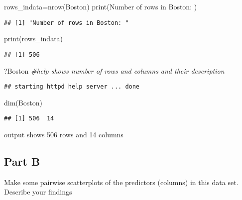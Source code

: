 \documentclass[
]{article}
\newenvironment{Shaded}{\begin{snugshade}}{\end{snugshade}}
\newcommand{\CommentTok}[1]{\textcolor[rgb]{0.56,0.35,0.01}{\textit{#1}}}
\newcommand{\FunctionTok}[1]{\textcolor[rgb]{0.00,0.00,0.00}{#1}}
\newcommand{\NormalTok}[1]{#1}
\newcommand{\OtherTok}[1]{\textcolor[rgb]{0.56,0.35,0.01}{#1}}
\newcommand{\StringTok}[1]{\textcolor[rgb]{0.31,0.60,0.02}{#1}}
\begin{document}
\begin{Shaded}
\begin{Highlighting}[]
\NormalTok{rows\_indata}\OtherTok{=}\FunctionTok{nrow}\NormalTok{(Boston)}
\FunctionTok{print}\NormalTok{(}\StringTok{\textquotesingle{}Number of rows in Boston: \textquotesingle{}}\NormalTok{)}
\end{Highlighting}
\end{Shaded}

\begin{verbatim}
## [1] "Number of rows in Boston: "
\end{verbatim}

\begin{Shaded}
\begin{Highlighting}[]
\FunctionTok{print}\NormalTok{(rows\_indata)}
\end{Highlighting}
\end{Shaded}

\begin{verbatim}
## [1] 506
\end{verbatim}

\begin{Shaded}
\begin{Highlighting}[]
\NormalTok{?Boston }\CommentTok{\#help shows number of rows and columns and their description}
\end{Highlighting}
\end{Shaded}

\begin{verbatim}
## starting httpd help server ... done
\end{verbatim}

\begin{Shaded}
\begin{Highlighting}[]
\FunctionTok{dim}\NormalTok{(Boston) }
\end{Highlighting}
\end{Shaded}

\begin{verbatim}
## [1] 506  14
\end{verbatim}

output shows 506 rows and 14 columns

\hypertarget{part-b}{%
\subsection{Part B}\label{part-b}}

Make some pairwise scatterplots of the predictors (columns) in this data
set. Describe your findings
\end{document}
